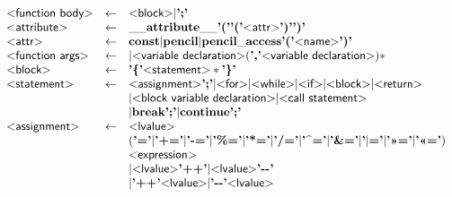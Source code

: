 \begin{figure}
\[\begin{array}{lcl}
  \text{\sf\textless function body\textgreater} & \gets & \text{\sf\textless block\textgreater} | \text{\bf';'}\\

  \text{\sf\textless attribute\textgreater} & \gets & \mathbf{\_\_attribute\_\_} \text{\bf'('}\text{\bf'('} \text{\sf\textless attr\textgreater} \text{\bf')'}\text{\bf')'}\\

  \text{\sf\textless attr\textgreater} & \gets & \mathbf{const} 
                          | \mathbf{pencil} 
                          |\mathbf{pencil\_access} \text{\bf'('} \text{\sf\textless name\textgreater} \text{\bf')'}
\\

  \text{\sf\textless function args\textgreater} & \gets & | \text{\sf\textless variable declaration\textgreater} (\text{\bf','} \text{\sf\textless variable declaration\textgreater})*\\

  \text{\sf\textless block\textgreater} & \gets & \text{\bf'\{'} \text{\sf\textless statement\textgreater} * \text{\bf'\}'}\\

  \text{\sf\textless statement\textgreater} & \gets & \text{\sf\textless assignment\textgreater} \text{\bf';'}
                               | \text{\sf\textless for\textgreater}
                               | \text{\sf\textless while\textgreater}
                               | \text{\sf\textless if\textgreater}
                               | \text{\sf\textless block\textgreater}
                               | \text{\sf\textless return\textgreater}\\ & &
                               | \text{\sf\textless block variable declaration\textgreater}
                               | \text{\sf\textless call statement\textgreater}\\ & &
                               | \mathbf{break} \text{\bf';'}
                               | \mathbf{continue} \text{\bf';'}
  \\

  \text{\sf\textless assignment\textgreater} & \gets & \text{\sf\textless lvalue\textgreater}\\&& (\text{\bf'='}
                                                        | \text{\bf'+='}
                                                        | \text{\bf'-='}
                                                        | \text{\bf'\%='}
                                                        | \text{\bf'*='}
                                                        | \text{\bf'/='}
                                                        | \text{\bf'\textasciicircum='}
                                                        | \text{\bf'\&='}
                                                        | \text{\bf'$|$='}
                                                        | \text{\bf'\textgreater\textgreater='}
                                                        | \text{\bf'\textless\textless='})\\&&
                                                         \text{\sf\textless expression\textgreater}\\ & &
                                                      | \text{\sf\textless lvalue\textgreater} \text{\bf'++'}
                                                      | \text{\sf\textless lvalue\textgreater} \text{\bf'{-}{-}'}\\&&
                                  |\text{\bf'++'} \text{\sf\textless lvalue\textgreater}
                                  |\text{\bf'{-}{-}'} \text{\sf\textless lvalue\textgreater}\\


\end{array}\]
\end{figure}
